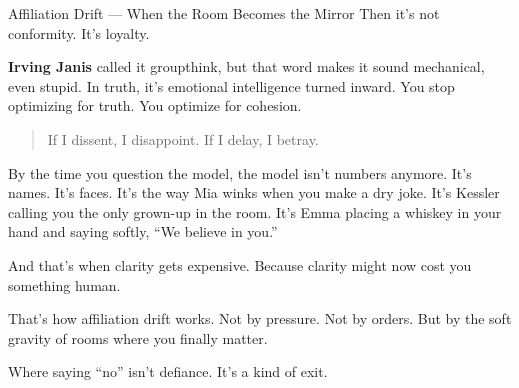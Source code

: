 \begin{PsychologicalSidebar}{Affiliation Drift --- When the Room Becomes the Mirror}
    Then it’s not conformity.
    It’s loyalty.
    
    \medskip
    
    \textbf{Irving Janis} called it groupthink, but that word makes it sound mechanical, even stupid.
    In truth, it’s emotional intelligence turned inward. You stop optimizing for truth. You optimize 
    for cohesion.
    
    \begin{quote}
    If I dissent, I disappoint.
    If I delay, I betray.
    \end{quote}
    
    By the time you question the model, the model isn’t numbers anymore.
    It’s names. It’s faces.
    It’s the way Mia winks when you make a dry joke.
    It’s Kessler calling you the only grown-up in the room.
    It’s Emma placing a whiskey in your hand and saying softly, “We believe in you.”
    
    \medskip
    
    And that’s when clarity gets expensive.
    Because clarity might now cost you something human.
    
    \medskip
    
    That’s how affiliation drift works.
    Not by pressure. Not by orders.
    But by the soft gravity of rooms where you finally matter.
    
    \medskip
    
    Where saying “no” isn’t defiance.
    It’s a kind of exit.
    
\end{PsychologicalSidebar}
    
    
